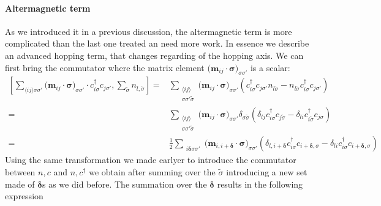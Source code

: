 \documentclass[../main.tex]{subfile}
\begin{document}
\paragraph{Altermagnetic term}
As we introduced it in a previous discussion, the altermagnetic term is more complicated than the last one treated an need more work. In essence we describe an 
advanced hopping term, that changes regarding of the hopping axis.
We can first bring the commutator where the matrix element $\bigl(\bm{m}_{ij}\cdot\bm{\sigma}\bigr)_{\sigma\sigma'} $ is a scalar:
\begin{equation*}
    \begin{aligned}
    \left[\sum_{\langle i j \rangle\sigma\sigma'}\bigl(\bm{m}_{ij}\cdot\bm{\sigma}\bigr)_{\sigma\sigma'} 
         \cdot c_{i\sigma}^{\dagger}c_{j\sigma'}, \sum_{\tilde{\sigma}} n_{l,\tilde{\sigma}}\right] 
        =&\sum_{\substack{\langle i j \rangle \\\sigma\sigma'\tilde{\sigma}}} 
         \bigl(\bm{m}_{ij}\cdot\bm{\sigma}\bigr)_{\sigma\sigma'}  \left(c_{i\sigma}^{\dagger}c_{j\sigma'}n_{l\tilde{\sigma}} 
        -n_{l\tilde{\sigma}}c_{i\sigma}^{\dagger}c_{j\sigma'} \right)\\
        = &\sum_{\substack{\langle i j \rangle \\\sigma\sigma'\tilde{\sigma}}}  \bigl(\bm{m}_{ij}\cdot\bm{\sigma}\bigr)_{\sigma\sigma'}  
         \delta_{\sigma\tilde{\sigma}} \left(\delta_{lj}c_{i\sigma}^{\dagger}c_{j\tilde{\sigma}} - \delta_{li}c_{i\tilde{\sigma}}^{\dagger}c_{j\sigma}\right)\\
        = &\frac{1}{2}\sum_{\substack{ i \bm{\delta}\sigma\sigma'}}  \bigl(\bm{m}_{i,i+\bm{\delta}}\cdot\bm{\sigma}\bigr)_{\sigma\sigma'}  
         \left(\delta_{l,i+\bm{\delta}}c_{i\sigma}^{\dagger}c_{i+\bm{\delta},\sigma} - \delta_{li}c_{i\sigma}^{\dagger}c_{i+\bm{\delta},\sigma}\right)
    \end{aligned}
\end{equation*}
Using the same transformation we made earlyer to introduce the commutator between $n,c$ and $n,c^{\dagger}$ we obtain after summing over the $\tilde{\sigma}$
introducing a new set made of  $\bm{\delta}$s as we did before. The summation over the $\bm{\delta}$ results in the following  expression
\end{document}
